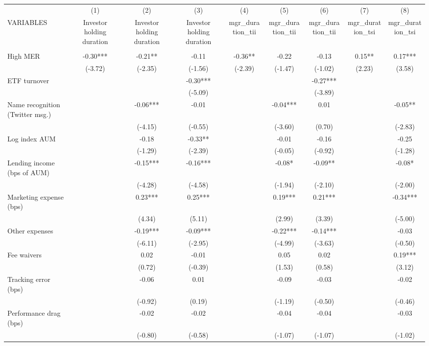 \documentclass[]{article}
\begin{document}
\begin{tabular}{lcccccccc} \hline
 & (1) & (2) & (3) & (4) & (5) & (6) & (7) & (8) \\
VARIABLES & Investor holding duration & Investor holding duration & Investor holding duration & mgr\_duration\_tii & mgr\_duration\_tii & mgr\_duration\_tii & mgr\_duration\_tsi & mgr\_duration\_tsi \\ \hline
 &  &  &  &  &  &  &  &  \\
High MER & -0.30*** & -0.21** & -0.11 & -0.36** & -0.22 & -0.13 & 0.15** & 0.17*** \\
 & (-3.72) & (-2.35) & (-1.56) & (-2.39) & (-1.47) & (-1.02) & (2.23) & (3.58) \\
ETF turnover &  &  & -0.30*** &  &  & -0.27*** &  &  \\
 &  &  & (-5.09) &  &  & (-3.89) &  &  \\
Name recognition (Twitter msg.) &  & -0.06*** & -0.01 &  & -0.04*** & 0.01 &  & -0.05** \\
 &  & (-4.15) & (-0.55) &  & (-3.60) & (0.70) &  & (-2.83) \\
Log index AUM &  & -0.18 & -0.33** &  & -0.01 & -0.16 &  & -0.25 \\
 &  & (-1.29) & (-2.39) &  & (-0.05) & (-0.92) &  & (-1.28) \\
Lending income (bps of AUM) &  & -0.15*** & -0.16*** &  & -0.08* & -0.09** &  & -0.08* \\
 &  & (-4.28) & (-4.58) &  & (-1.94) & (-2.10) &  & (-2.00) \\
Marketing expense (bps) &  & 0.23*** & 0.25*** &  & 0.19*** & 0.21*** &  & -0.34*** \\
 &  & (4.34) & (5.11) &  & (2.99) & (3.39) &  & (-5.00) \\
Other expenses &  & -0.19*** & -0.09*** &  & -0.22*** & -0.14*** &  & -0.03 \\
 &  & (-6.11) & (-2.95) &  & (-4.99) & (-3.63) &  & (-0.50) \\
Fee waivers &  & 0.02 & -0.01 &  & 0.05 & 0.02 &  & 0.19*** \\
 &  & (0.72) & (-0.39) &  & (1.53) & (0.58) &  & (3.12) \\
Tracking error (bps) &  & -0.06 & 0.01 &  & -0.09 & -0.03 &  & -0.02 \\
 &  & (-0.92) & (0.19) &  & (-1.19) & (-0.50) &  & (-0.46) \\
Performance drag (bps) &  & -0.02 & -0.02 &  & -0.04 & -0.04 &  & -0.03 \\
 &  & (-0.80) & (-0.58) &  & (-1.07) & (-1.07) &  & (-1.02) \\

\end{tabular}
\end{document}
